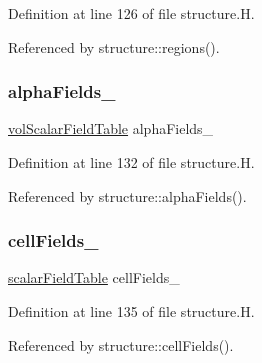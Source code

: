 Definition at line 126 of file structure.\+H.



Referenced by structure\+::regions().

\mbox{\label{classFoam_1_1structure_a8ddca6cc34b86786d9370b225a5a7e8e}} 
\subsubsection{\texorpdfstring{alpha\+Fields\+\_\+}{alphaFields\_}}
{\footnotesize\ttfamily \hyperlink{classFoam_1_1structure_a821486e30c5f9ed2852aeddc4ff8ff30}{vol\+Scalar\+Field\+Table} alpha\+Fields\+\_\+\hspace{0.3cm}{\ttfamily [protected]}}



Definition at line 132 of file structure.\+H.



Referenced by structure\+::alpha\+Fields().

\mbox{\label{classFoam_1_1structure_a7136e90f04e342e45cde90d74b7e296e}} 
\subsubsection{\texorpdfstring{cell\+Fields\+\_\+}{cellFields\_}}
{\footnotesize\ttfamily \hyperlink{classFoam_1_1structure_a2fdb5cf3126746b10e53fb86215f3249}{scalar\+Field\+Table} cell\+Fields\+\_\+\hspace{0.3cm}{\ttfamily [protected]}}



Definition at line 135 of file structure.\+H.



Referenced by structure\+::cell\+Fields().

\mbox{\label{classFoam_1_1structure_adbcc8a0fc193681fc80b55dee1f8d5b2}} 
